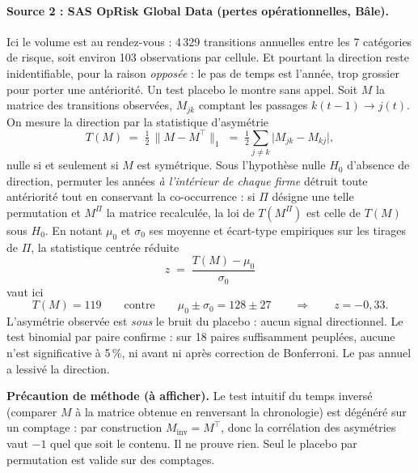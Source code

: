 \paragraph{Source 2 : SAS OpRisk Global Data (pertes opérationnelles, Bâle).}
Ici le volume est au rendez-vous : 4\,329 transitions annuelles entre les
7 catégories de risque, soit environ 103 observations par cellule. Et pourtant la
direction reste inidentifiable, pour la raison \emph{opposée} : le pas de temps est
l'année, trop grossier pour porter une antériorité. Un test placebo le montre sans
appel. Soit $M$ la matrice des transitions observées, $M_{jk}$ comptant les passages
$k(t-1)\to j(t)$. On mesure la direction par la statistique d'asymétrie
\begin{equation}
  T(M) \;=\; \tfrac{1}{2}\,\lVert M - M^{\top}\rVert_1
        \;=\; \tfrac{1}{2}\sum_{j\neq k}\bigl|M_{jk}-M_{kj}\bigr| ,
  \label{eq:asymetrie}
\end{equation}
nulle si et seulement si $M$ est symétrique. Sous l'hypothèse nulle $H_0$ d'absence de
direction, permuter les années \emph{à l'intérieur de chaque firme} détruit toute antériorité
tout en conservant la co-occurrence : si $\Pi$ désigne une telle permutation et $M^{\Pi}$ la
matrice recalculée, la loi de $T(M^{\Pi})$ est celle de $T(M)$ sous $H_0$. En notant $\mu_0$ et
$\sigma_0$ ses moyenne et écart-type empiriques sur les tirages de $\Pi$, la statistique
centrée réduite
\begin{equation}
  z \;=\; \frac{T(M)-\mu_0}{\sigma_0}
  \label{eq:placebo-z}
\end{equation}
vaut ici
\[
T(M) = 119 \qquad\text{contre}\qquad \mu_0 \pm \sigma_0 = 128 \pm 27
\qquad\Longrightarrow\qquad z = -0{,}33 .
\]
L'asymétrie observée est \emph{sous} le bruit du placebo : aucun signal directionnel. Le
test binomial par paire confirme : sur 18 paires suffisamment peuplées, aucune
n'est significative à 5\,\%, ni avant ni après correction de Bonferroni. Le pas annuel a
lessivé la direction.

\begin{cle}
\textbf{Précaution de méthode (à afficher).} Le test intuitif du \og temps inversé \fg{}
(comparer $M$ à la matrice obtenue en renversant la chronologie) est dégénéré sur
un comptage : par construction $M_{\text{inv}} = M^\top$, donc la corrélation des asymétries
vaut $-1$ quel que soit le contenu. Il ne prouve rien. Seul le placebo par
permutation est valide sur des comptages.
\end{cle}


